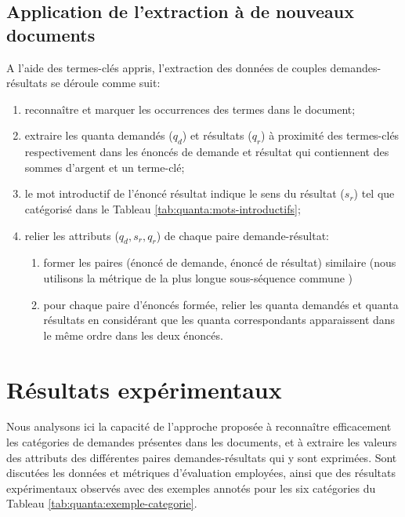 \subsection{Application de l'extraction à de nouveaux documents}
A l'aide des termes-clés appris, l'extraction des données de couples demandes-résultats se déroule comme suit:
\begin{enumerate}
	\item reconnaître et marquer les occurrences des termes dans le document;
	\item extraire les quanta demandés ($q_d$) et résultats ($q_r$) à proximité des termes-clés respectivement dans les énoncés de demande et résultat qui contiennent des sommes d'argent et un terme-clé;
	\item le mot introductif de l'énoncé résultat indique le sens du résultat ($s_r$) tel que catégorisé dans le Tableau \ref{tab:quanta:mots-introductifs};
	\item relier les attributs ($q_d, s_r, q_r$) de chaque paire demande-résultat:%
	\begin{enumerate}
		\item former les paires (énoncé de demande, énoncé de résultat) similaire (nous utilisons la métrique de \og la plus longue sous-séquence commune \fg{} \citep{hirschberg1977algorithms_LCS, bakkelund2009lcs}) 
		\item pour chaque paire d'énoncés formée, relier les quanta demandés et quanta résultats en considérant que les quanta correspondants apparaissent dans le même ordre dans les deux énoncés.
	\end{enumerate}
\end{enumerate}

\section{Résultats expérimentaux}

Nous analysons ici la capacité de l'approche proposée à reconnaître efficacement les catégories de demandes présentes dans les documents, et à extraire les valeurs des attributs des différentes paires demandes-résultats qui y sont exprimées. Sont discutées les données et métriques d'évaluation employées, ainsi que des résultats expérimentaux observés avec des exemples annotés pour les six catégories du Tableau \ref{tab:quanta:exemple-categorie}. 

